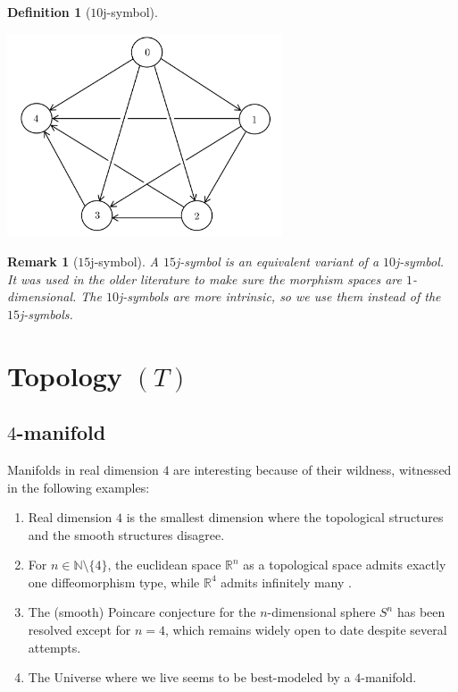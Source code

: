 \documentclass[12pt]{extarticle}
\numberwithin{equation}{section} %
\theoremstyle{mystyle}
\newtheorem{definition}[equation]{Definition}
\newtheorem{remark}[equation]{Remark}
\begin{document}
\begin{definition}[$10$j-symbol]
\begin{center}
    \includegraphics[height=6cm]{10j-geometric}
  \end{center}
\end{definition}

\begin{remark}[$15$j-symbol]\label{remark/15j-symbol}
  A $15$j-symbol is an equivalent variant of a $10$j-symbol. It
  was used in the older literature to make sure the morphism
  spaces are $1$-dimensional. The $10$j-symbols are more
  intrinsic, so we use them instead of the $15$j-symbols.
\end{remark}
\section{Topology $(T)$}\label{section/topology}
\subsection{$4$-manifold}

Manifolds in real dimension $4$ are interesting because of their
wildness, witnessed in the following examples:

\begin{enumerate}
  \item Real dimension $4$ is the smallest dimension where the
        topological structures and the smooth structures
        disagree.
  \item For $n \in \mathbb{N}\setminus\{4\}$, the euclidean space
        $\mathbb{R}^{n}$ as a topological space admits exactly
        one diffeomorphism type, while $\mathbb{R}^{4}$ admits
        infinitely many
        \cite{scorpan/the-wild-world-of-4-manifolds}\cite[p.2]{milnor/topological-manifolds-and-smooth-manifolds}.
  \item The (smooth) Poincare conjecture for the $n$-dimensional
        sphere $S^{n}$ has been resolved except for $n=4$, which
        remains widely open to date despite several attempts.
  \item The Universe where we live seems to be best-modeled by a
        $4$-manifold.
\end{enumerate}
\end{document}
